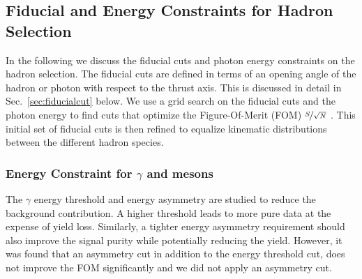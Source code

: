 

\subsection{Fiducial and Energy Constraints for Hadron Selection}
\label{sec:fidAndEnergyCuts}
In the following we discuss the fiducial cuts and photon energy constraints on the hadron selection. The fiducial cuts are defined in terms of an opening angle of the hadron or photon with respect to the
thrust axis. This is discussed in detail in Sec.~\ref{sec:fiducialcut} below. We use a grid search on the fiducial cuts and the photon energy to find cuts that optimize the Figure-Of-Merit (FOM) $\nicefrac{S}{\sqrt{N}}$ . This initial set of fiducial cuts is then refined to equalize kinematic distributions between the different hadron species.

\subsubsection{\texorpdfstring{Energy Constraint for $\gamma$ and mesons}{Energy Constraint for gamma and mesons}}

The $\gamma$ energy threshold and energy asymmetry are studied to reduce the background contribution. A higher threshold leads to more pure data at the expense of yield loss. Similarly, a tighter energy asymmetry requirement should also improve the signal purity while potentially reducing the yield. However, it was found that an asymmetry cut in addition to the energy threshold cut, does not improve the FOM significantly and we did not apply an asymmetry cut.

